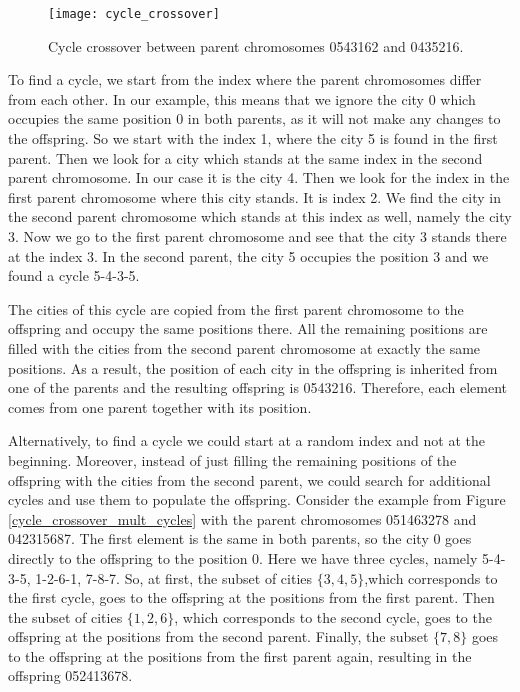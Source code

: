 \begin{figure}[htp] \centering
	\centering
	\texttt{[image: cycle\_crossover]}
	\caption{Cycle crossover between parent chromosomes 0543162 and 0435216.}
	\label{cycle_crossover}
\end{figure}

To find a cycle, we start from the index where the parent chromosomes differ from each other. In our example, this means that we ignore the city 0 which occupies the same position 0 in both parents, as it will not make any changes to the offspring. So we start with the index 1, where the city 5 is found in the first parent. Then we look for a city which stands at the same index in the second parent chromosome. In our case it is the city 4. Then we look for the index in the first parent chromosome where this city stands. It is index 2. We find the city in the second parent chromosome which stands at this index as well, namely the city 3. Now we go to the first parent chromosome and see that the city 3 stands there at the index 3. In the second parent, the city 5 occupies the position 3 and we found a cycle 5-4-3-5. \par

The cities of this cycle are copied from the first parent chromosome to the offspring and occupy the same positions there. All the remaining positions are filled with the cities from the second parent chromosome at exactly the same positions. As a result, the position of each city in the offspring is inherited from one of the parents and the resulting offspring is 0543216. Therefore, each element comes from one parent together with its position.\par

Alternatively, to find a cycle we could start at a random index and not at the beginning. Moreover, instead of just filling the remaining positions of the offspring with the cities from the second parent, we could search for additional cycles and use them to populate the offspring. Consider the example from Figure \ref{cycle_crossover_mult_cycles} with the parent chromosomes 051463278 and 042315687. The first element is the same in both parents, so the city 0 goes directly to the offspring to the position 0. Here we have  three cycles, namely 5-4-3-5, 1-2-6-1, 7-8-7. So, at first, the subset of cities $\{3,4,5\}$,which corresponds to the first cycle, goes to the offspring at the positions from the first parent. Then the subset of cities $\{1,2,6\}$, which corresponds to the second cycle, goes to the offspring at the positions from the second parent. Finally, the subset $\{7,8\}$ goes to the offspring at the positions from the first parent again, resulting in the offspring 052413678.

